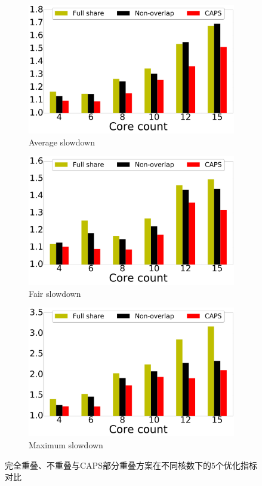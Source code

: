 \begin{figure}[htbp]
\begin{subfigure}[b]{0.5\linewidth}
    \end{subfigure}
    \begin{subfigure}[b]{0.5\linewidth}
        \centering\includegraphics[width=0.9\linewidth]{figures/ws.pdf}
        \caption{Average slowdown}
    \end{subfigure}%
    \begin{subfigure}[b]{0.5\linewidth}
        \centering\includegraphics[width=0.9\linewidth]{figures/fs.pdf}
        \caption{Fair slowdown}
    \end{subfigure}
    \begin{subfigure}[b]{0.5\linewidth}
        \centering\includegraphics[width=0.9\linewidth]{figures/ms.pdf}
        \caption{Maximum slowdown}
    \end{subfigure}
    \caption{完全重叠、不重叠与CAPS部分重叠方案在不同核数下的5个优化指标对比}
    \label{fig:core_count}
\end{figure}


